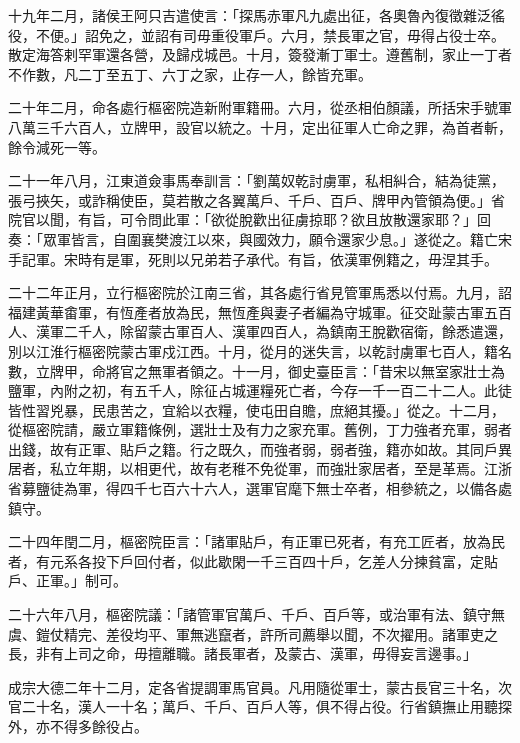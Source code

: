 \begin{pinyinscope}
 十九年二月，諸侯王阿只吉遣使言：「探馬赤軍凡九處出征，各奧魯內復徵雜泛徭役，不便。」詔免之，並詔有司毋重役軍戶。六月，禁長軍之官，毋得占役士卒。散定海答剌罕軍還各營，及歸戍城邑。十月，簽發漸丁軍士。遵舊制，家止一丁者不作數，凡二丁至五丁、六丁之家，止存一人，餘皆充軍。



 二十年二月，命各處行樞密院造新附軍籍冊。六月，從丞相伯顏議，所括宋手號軍八萬三千六百人，立牌甲，設官以統之。十月，定出征軍人亡命之罪，為首者斬，餘令減死一等。



 二十一年八月，江東道僉事馬奉訓言：「劉萬奴乾討虜軍，私相糾合，結為徒黨，張弓挾矢，或詐稱使臣，莫若散之各翼萬戶、千戶、百戶、牌甲內管領為便。」省院官以聞，有旨，可令問此軍：「欲從脫歡出征虜掠耶？欲且放散還家耶？」回奏：「眾軍皆言，自圍襄樊渡江以來，與國效力，願令還家少息。」遂從之。籍亡宋手記軍。宋時有是軍，死則以兄弟若子承代。有旨，依漢軍例籍之，毋涅其手。



 二十二年正月，立行樞密院於江南三省，其各處行省見管軍馬悉以付焉。九月，詔福建黃華畬軍，有恆產者放為民，無恆產與妻子者編為守城軍。征交趾蒙古軍五百人、漢軍二千人，除留蒙古軍百人、漢軍四百人，為鎮南王脫歡宿衛，餘悉遣還，別以江淮行樞密院蒙古軍戍江西。十月，從月的迷失言，以乾討虜軍七百人，籍名數，立牌甲，命將官之無軍者領之。十一月，御史臺臣言：「昔宋以無室家壯士為鹽軍，內附之初，有五千人，除征占城運糧死亡者，今存一千一百二十二人。此徒皆性習兇暴，民患苦之，宜給以衣糧，使屯田自贍，庶絕其擾。」從之。十二月，從樞密院請，嚴立軍籍條例，選壯士及有力之家充軍。舊例，丁力強者充軍，弱者出錢，故有正軍、貼戶之籍。行之既久，而強者弱，弱者強，籍亦如故。其同戶異居者，私立年期，以相更代，故有老稚不免從軍，而強壯家居者，至是革焉。江浙省募鹽徒為軍，得四千七百六十六人，選軍官麾下無士卒者，相參統之，以備各處鎮守。



 二十四年閏二月，樞密院臣言：「諸軍貼戶，有正軍已死者，有充工匠者，放為民者，有元系各投下戶回付者，似此歇閑一千三百四十戶，乞差人分揀貧富，定貼戶、正軍。」制可。



 二十六年八月，樞密院議：「諸管軍官萬戶、千戶、百戶等，或治軍有法、鎮守無虞、鎧仗精完、差役均平、軍無逃竄者，許所司薦舉以聞，不次擢用。諸軍吏之長，非有上司之命，毋擅離職。諸長軍者，及蒙古、漢軍，毋得妄言邊事。」



 成宗大德二年十二月，定各省提調軍馬官員。凡用隨從軍士，蒙古長官三十名，次官二十名，漢人一十名；萬戶、千戶、百戶人等，俱不得占役。行省鎮撫止用聽探外，亦不得多餘役占。




\end{pinyinscope}

